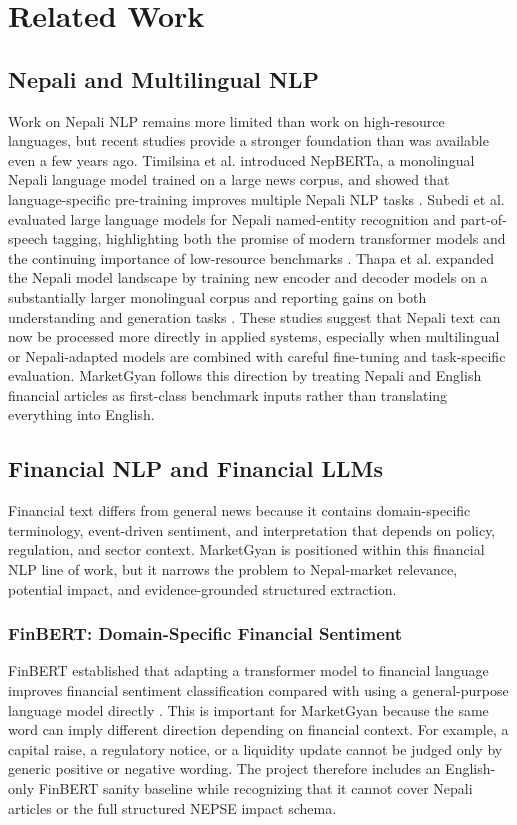 \documentclass[12pt,a4paper]{report}
\begin{document}
\chapter{Related Work}

\section{Nepali and Multilingual NLP}
Work on Nepali NLP remains more limited than work on high-resource languages, but recent studies provide a stronger foundation than was available even a few years ago. Timilsina et al. introduced NepBERTa, a monolingual Nepali language model trained on a large news corpus, and showed that language-specific pre-training improves multiple Nepali NLP tasks \cite{timilsina2022}. Subedi et al. evaluated large language models for Nepali named-entity recognition and part-of-speech tagging, highlighting both the promise of modern transformer models and the continuing importance of low-resource benchmarks \cite{subedi2024}. Thapa et al. expanded the Nepali model landscape by training new encoder and decoder models on a substantially larger monolingual corpus and reporting gains on both understanding and generation tasks \cite{thapa2025}. These studies suggest that Nepali text can now be processed more directly in applied systems, especially when multilingual or Nepali-adapted models are combined with careful fine-tuning and task-specific evaluation. MarketGyan follows this direction by treating Nepali and English financial articles as first-class benchmark inputs rather than translating everything into English.

\section{Financial NLP and Financial LLMs}
Financial text differs from general news because it contains domain-specific terminology, event-driven sentiment, and interpretation that depends on policy, regulation, and sector context. MarketGyan is positioned within this financial NLP line of work, but it narrows the problem to Nepal-market relevance, potential impact, and evidence-grounded structured extraction.

\subsection{FinBERT: Domain-Specific Financial Sentiment}
FinBERT established that adapting a transformer model to financial language improves financial sentiment classification compared with using a general-purpose language model directly \cite{araci2019finbert}. This is important for MarketGyan because the same word can imply different direction depending on financial context. For example, a capital raise, a regulatory notice, or a liquidity update cannot be judged only by generic positive or negative wording. The project therefore includes an English-only FinBERT sanity baseline while recognizing that it cannot cover Nepali articles or the full structured NEPSE impact schema.
\end{document}
